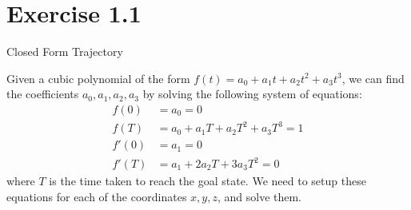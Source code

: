\section*{Exercise 1.1}
Closed Form Trajectory

Given a cubic polynomial of the form \(f(t) = a_0 + a_1t + a_2t^2 + a_3t^3\), we can find the coefficients \(a_0, a_1, a_2, a_3\) by solving the following system of equations:
\begin{align*}
    f(0)  & = a_0 = 0                          \\
    f(T)  & = a_0 + a_1T + a_2T^2 + a_3T^3 = 1 \\
    f'(0) & = a_1 = 0                          \\
    f'(T) & = a_1 + 2a_2T + 3a_3T^2 = 0
\end{align*}
where \(T\) is the time taken to reach the goal state.
We need to setup these equations for each of the coordinates \(x, y, z\), and solve them.
